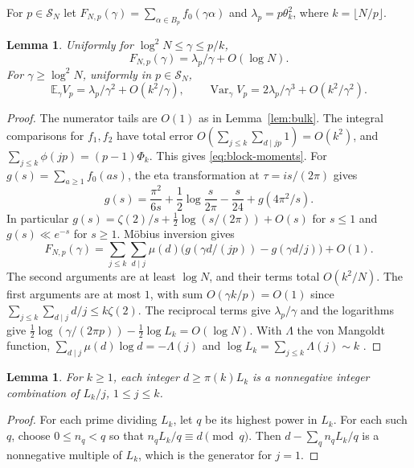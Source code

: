\documentclass[11pt]{amsart}
\newtheorem{lemma}[theorem]{Lemma}
\theoremstyle{remark}
\DeclareMathOperator{\Var}{Var}
\newcommand{\Ee}{\mathbb E}
\begin{document}
For \(p\in\mathcal S_N\) let \(F_{N,p}(\gamma)=
\sum_{\alpha\in B_p} f_0(\gamma\alpha)\) and \(\lambda_p=p\theta_k^2\),
where \(k=\lfloor N/p\rfloor\).
\begin{lemma}\label{lem:block-energy}
Uniformly for \(\log^2 N\le\gamma\le p/k\),
\begin{equation}\label{eq:block-energy}
 F_{N,p}(\gamma)=\lambda_p/\gamma+O(\log N).
\end{equation}
For \(\gamma\ge\log^2 N\), uniformly in \(p\in\mathcal S_N\),
\begin{equation}\label{eq:block-moments}
 \Ee_\gamma V_p=\lambda_p/\gamma^2+O(k^2/\gamma),\qquad
 \Var_\gamma V_p=2\lambda_p/\gamma^3+O(k^2/\gamma^2).
\end{equation}
\end{lemma}
\begin{proof}
The numerator tails are \(O(1)\) as in Lemma~\ref{lem:bulk}.
The integral comparisons for \(f_1,f_2\) have total error
\(O(\sum_{j\le k}\sum_{d\mid jp}1)=O(k^2)\), and
\(\sum_{j\le k}\phi(jp)=(p-1)\Phi_k\). This gives \eqref{eq:block-moments}.
For \(g(s)=\sum_{a\ge1}f_0(as)\), the eta transformation at
\(\tau=is/(2\pi)\) gives \cite[Ch.~3]{apostol-modular}
\begin{equation}\label{eq:eta}
 g(s)=\frac{\pi^2}{6s}+\frac12\log\frac{s}{2\pi}-\frac{s}{24}+g(4\pi^2/s).
\end{equation}
In particular \(g(s)=\zeta(2)/s+\tfrac12\log(s/(2\pi))+O(s)\)
for \(s\le1\) and \(g(s)\ll e^{-s}\) for \(s\ge1\).
M\"obius inversion gives
\[
 F_{N,p}(\gamma)=
 \sum_{j\le k}\sum_{d\mid j}\mu(d)
  \bigl(g(\gamma d/(jp))-g(\gamma d/j)\bigr)+O(1).
\]
The second arguments are at least \(\log N\), and their terms total
\(O(k^2/N)\). The first arguments are at most \(1\), with sum
\(O(\gamma k/p)=O(1)\) since
\(\sum_{j\le k}\sum_{d\mid j} d/j\le k\zeta(2)\).
The reciprocal terms give \(\lambda_p/\gamma\) and the logarithms
give \(\tfrac12\log(\gamma/(2\pi p))-\tfrac12\log L_k=O(\log N)\).
With \(\Lambda\) the von Mangoldt function, \(\sum_{d\mid j}\mu(d)\log d=-\Lambda(j)\) and
\(\log L_k=\sum_{j\le k}\Lambda(j)\sim k\)
\cite[(6.12)]{montgomery-vaughan}.
\end{proof}

\begin{lemma}\label{lem:completion}
For \(k\ge1\), each integer \(d\ge\pi(k)L_k\) is a nonnegative integer
combination of \(L_k/j\), \(1\le j\le k\).
\end{lemma}
\begin{proof}
For each prime dividing \(L_k\), let \(q\) be its highest power in \(L_k\).
For each such \(q\),
choose \(0\le n_q<q\) so that \(n_q L_k/q\equiv d\pmod q\).
Then \(d-\sum_q n_qL_k/q\) is a nonnegative multiple of \(L_k\),
which is the generator for \(j=1\).
\end{proof}
\end{document}
